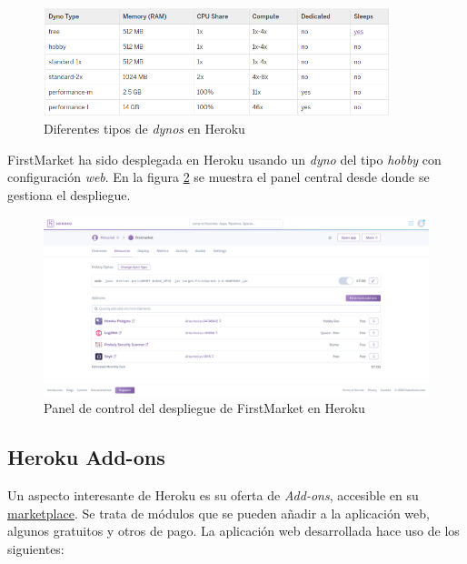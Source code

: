 \documentclass[a4paper]{article}
\begin{document}
    \begin{figure}[hbt!]
       	\centering
       	\includegraphics[width=0.9\textwidth,keepaspectratio]{dyno_types}
       	\caption{Diferentes tipos de \emph{dynos} en Heroku}
       	\label{fig:dyno_types}
    \end{figure}
    
    FirstMarket ha sido desplegada en Heroku usando un \emph{dyno} del tipo \emph{hobby} con configuración \emph{web}. En la figura \ref{fig:heroku} se muestra el panel central desde donde se gestiona el despliegue.
    
    \begin{figure}[hbt!]
       	\centering
       	\includegraphics[width=\textwidth,keepaspectratio]{heroku}
       	\caption{Panel de control del despliegue de FirstMarket en Heroku}
       	\label{fig:heroku}
    \end{figure}

    \subsection{Heroku Add-ons} \label{sec:addons}
    Un aspecto interesante de Heroku es su oferta de \emph{Add-ons}, accesible en su \href{https://elements.heroku.com/addons}{marketplace}. Se trata de módulos que se pueden añadir a la aplicación web, algunos gratuitos y otros de pago. La aplicación web desarrollada hace uso de los siguientes:
    
\end{document}
